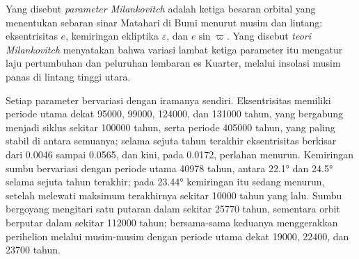 \begin{definition}\label{def:b2:orbital-forcing:milankovitch}
Yang disebut \emph{parameter Milankovitch} adalah ketiga besaran
orbital yang menentukan sebaran sinar Matahari di Bumi menurut musim dan
lintang: eksentrisitas $e$, kemiringan ekliptika $\varepsilon$, dan 
$e\sin\varpi$. Yang disebut \emph{teori Milankovitch} menyatakan bahwa variasi lambat
ketiga parameter itu mengatur laju pertumbuhan dan peluruhan lembaran es Kuarter, melalui insolasi musim panas
di lintang tinggi utara.
\end{definition}

Setiap parameter bervariasi dengan iramanya sendiri. Eksentrisitas memiliki periode utama dekat \num{95000},
\num{99000}, \num{124000}, dan \num{131000} tahun, yang bergabung menjadi siklus sekitar
\num{100000} tahun, serta periode \num{405000} tahun, yang paling stabil di antara semuanya; selama sejuta
tahun terakhir eksentrisitas berkisar dari \num{0.0046} sampai \num{0.0565}, dan kini, pada \num{0.0172}, perlahan
menurun. Kemiringan sumbu bervariasi dengan periode utama \num{40978} tahun, antara \ang{22.1} dan
\ang{24.5} selama sejuta tahun terakhir; pada \ang{23.44} kemiringan itu sedang menurun, setelah melewati maksimum terakhirnya
sekitar \num{10000} tahun yang lalu. Sumbu bergoyang mengitari satu putaran dalam sekitar \num{25770} tahun, sementara
orbit berputar dalam sekitar \num{112000} tahun; bersama-sama keduanya menggerakkan perihelion melalui musim-musim dengan
periode utama dekat \num{19000}, \num{22400}, dan \num{23700} tahun.

